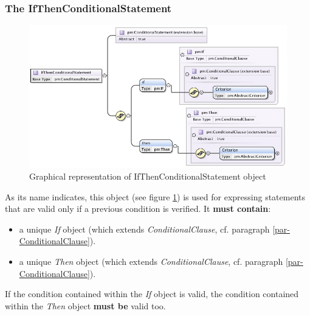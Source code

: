 \documentclass[a4paper,11pt] {ivoa}
\begin{document}
\subsubsection{The IfThenConditionalStatement}\label{par-IfThenConditionalStatement}
\begin{figure}[htbp]
\begin{center}
\includegraphics[width=1.0\textwidth]{pictures/IfThenStatement.jpg} 
\caption{Graphical representation of IfThenConditionalStatement object}
\label{Pic-IfThenConditionalStatement}
\end{center}
\end{figure}
As its name indicates, this object (see figure \ref{Pic-IfThenConditionalStatement}) is used for
expressing statements that are valid only if a previous condition is verified. It {\bf must
contain}:
\begin{itemize}
\item a unique {\it If} object (which extends {\it ConditionalClause}, cf. paragraph
\ref{par-ConditionalClause}).
\item a unique {\it Then} object (which extends {\it ConditionalClause}, cf. paragraph
\ref{par-ConditionalClause}).
\end{itemize}
If the condition contained within the {\it If} object is valid, the condition contained within
the {\it Then} object {\bf must be} valid too.
\end{document}
